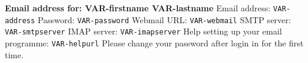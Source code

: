 \textbf{Email address for: VAR-firstname VAR-lastname}\smallskip
Email address: \texttt{VAR-address}
Password: \texttt{VAR-password}
Webmail URL: \texttt{VAR-webmail}
SMTP server: \texttt{VAR-smtpserver}
IMAP server: \texttt{VAR-imapserver}
Help setting up your email programme: \texttt{VAR-helpurl}
\bigskip
Please change your password after login in for the first time.
~

